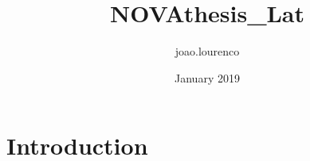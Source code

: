 \documentclass{article}
\title{NOVAthesis_Lat}
\author{joao.lourenco }
\date{January 2019}
\begin{document}
\maketitle

\section{Introduction}
\end{document}
